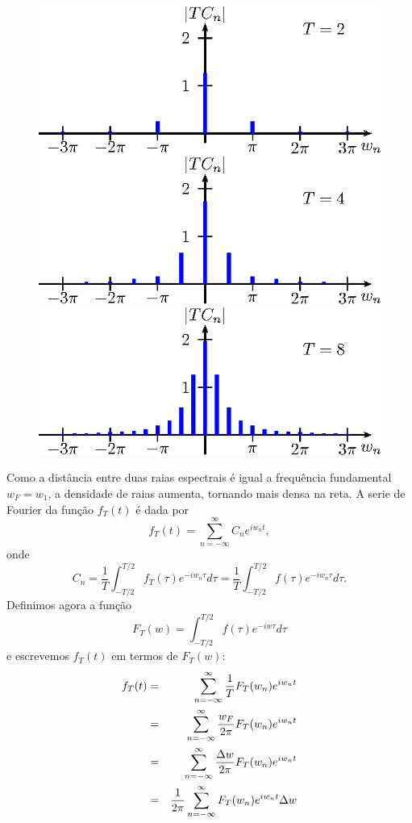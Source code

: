 \begin{ex}{\label{ex_Transf_1}}
\begin{figure}[!ht]
\includegraphics{cap_transformada_de_fourier/pics/figura_4}
\includegraphics{cap_transformada_de_fourier/pics/figura_5}
\includegraphics{cap_transformada_de_fourier/pics/figura_6}\caption{\label{dia_espc_tenda}}
\end{figure}
 \end{ex}
Como a distância entre duas raias espectrais é igual a frequência fundamental $w_F=w_1$, a densidade de raias aumenta, tornando mais densa na reta. A serie de Fourier da função $f_T(t)$ é dada por
$$
f_T(t)=\sum_{n=-\infty}^\infty C_n e^{i w_n t},
$$
onde 
$$C_n=\frac{1}{T}\int_{-T/2}^{T/2}f_T(\tau)e^{-iw_n \tau}d\tau=\frac{1}{T}\int_{-T/2}^{T/2}f(\tau)e^{-iw_n \tau}d\tau.$$
Definimos agora a função $$F_T(w)=\int_{-T/2}^{T/2}f(\tau)e^{-iw \tau}d\tau$$ e escrevemos $f_T(t)$ em termos de $F_T(w)$:
\begin{eqnarray}
\nonumber f_T(t)&=&\sum_{n=-\infty}^\infty \frac{1}{T}F_T(w_n) e^{i w_n t}\\&=& \sum_{n=-\infty}^\infty \frac{w_F}{2\pi}F_T(w_n) e^{i w_n t}
\\\nonumber &=& \sum_{n=-\infty}^\infty \frac{\Delta w}{2\pi}F_T(w_n) e^{i w_n t}
\\{\label{f_T}}&=&\frac{1}{2\pi} \sum_{n=-\infty}^\infty F_T(w_n) e^{i w_n t}\Delta w
\end{eqnarray}
